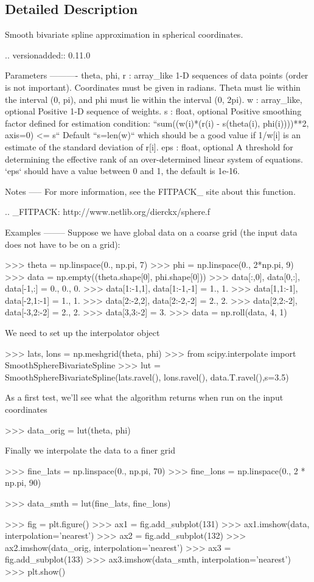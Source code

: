 \subsection{Detailed Description}
\begin{DoxyVerb}Smooth bivariate spline approximation in spherical coordinates.

.. versionadded:: 0.11.0

Parameters
----------
theta, phi, r : array_like
    1-D sequences of data points (order is not important). Coordinates
    must be given in radians. Theta must lie within the interval (0, pi),
    and phi must lie within the interval (0, 2pi).
w : array_like, optional
    Positive 1-D sequence of weights.
s : float, optional
    Positive smoothing factor defined for estimation condition:
    ``sum((w(i)*(r(i) - s(theta(i), phi(i))))**2, axis=0) <= s``
    Default ``s=len(w)`` which should be a good value if 1/w[i] is an
    estimate of the standard deviation of r[i].
eps : float, optional
    A threshold for determining the effective rank of an over-determined
    linear system of equations. `eps` should have a value between 0 and 1,
    the default is 1e-16.

Notes
-----
For more information, see the FITPACK_ site about this function.

.. _FITPACK: http://www.netlib.org/dierckx/sphere.f

Examples
--------
Suppose we have global data on a coarse grid (the input data does not
have to be on a grid):

>>> theta = np.linspace(0., np.pi, 7)
>>> phi = np.linspace(0., 2*np.pi, 9)
>>> data = np.empty((theta.shape[0], phi.shape[0]))
>>> data[:,0], data[0,:], data[-1,:] = 0., 0., 0.
>>> data[1:-1,1], data[1:-1,-1] = 1., 1.
>>> data[1,1:-1], data[-2,1:-1] = 1., 1.
>>> data[2:-2,2], data[2:-2,-2] = 2., 2.
>>> data[2,2:-2], data[-3,2:-2] = 2., 2.
>>> data[3,3:-2] = 3.
>>> data = np.roll(data, 4, 1)

We need to set up the interpolator object

>>> lats, lons = np.meshgrid(theta, phi)
>>> from scipy.interpolate import SmoothSphereBivariateSpline
>>> lut = SmoothSphereBivariateSpline(lats.ravel(), lons.ravel(),
                                     data.T.ravel(),s=3.5)

As a first test, we'll see what the algorithm returns when run on the
input coordinates

>>> data_orig = lut(theta, phi)

Finally we interpolate the data to a finer grid

>>> fine_lats = np.linspace(0., np.pi, 70)
>>> fine_lons = np.linspace(0., 2 * np.pi, 90)

>>> data_smth = lut(fine_lats, fine_lons)

>>> fig = plt.figure()
>>> ax1 = fig.add_subplot(131)
>>> ax1.imshow(data, interpolation='nearest')
>>> ax2 = fig.add_subplot(132)
>>> ax2.imshow(data_orig, interpolation='nearest')
>>> ax3 = fig.add_subplot(133)
>>> ax3.imshow(data_smth, interpolation='nearest')
>>> plt.show()\end{DoxyVerb}
 

